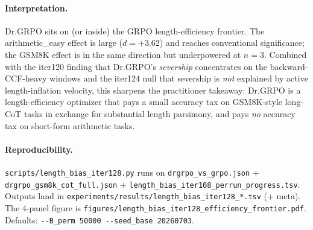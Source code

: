\paragraph{Interpretation.}
Dr.GRPO sits on (or inside) the GRPO length-efficiency frontier.
The arithmetic\_easy effect is large ($d = +3.62$) and reaches
conventional significance; the GSM8K effect is in the same
direction but underpowered at $n{=}3$.  Combined with the iter120
finding that Dr.GRPO's \emph{severship} concentrates on the
backward-CCF-heavy windows and the iter124 null that severship is
\emph{not} explained by active length-inflation velocity, this
sharpens the practitioner takeaway: Dr.GRPO is a length-efficiency
optimizer that pays a small accuracy tax on GSM8K-style long-CoT
tasks in exchange for substantial length parsimony, and pays
\emph{no} accuracy tax on short-form arithmetic tasks.

\paragraph{Reproducibility.}
\verb|scripts/length_bias_iter128.py| runs on
\verb|drgrpo_vs_grpo.json| + \verb|drgrpo_gsm8k_cot_full.json| +
\verb|length_bias_iter108_perrun_progress.tsv|.
Outputs land in
\verb|experiments/results/length_bias_iter128_*.tsv| (+ meta).
The 4-panel figure is \verb|figures/length_bias_iter128_efficiency_frontier.pdf|.
Defaults: \verb|--B_perm 50000 --seed_base 20260703|.